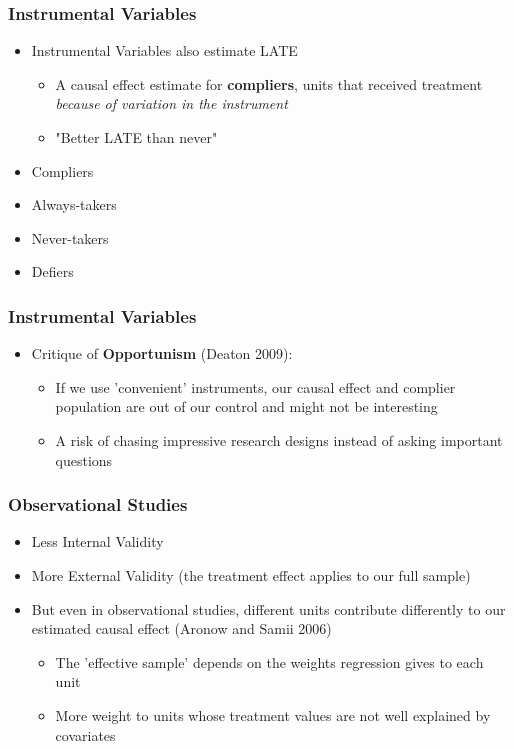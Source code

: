 \documentclass[xcolor=x11names,compress]{beamer}\usepackage[]{graphicx}\usepackage[]{xcolor}
\renewcommand{\(}{\begin{columns}}
\renewcommand{\)}{\end{columns}}
\newcommand{\<}[1]{\begin{column}{#1}}
\renewcommand{\>}{\end{column}}
\begin{document}
\begin{frame}
\frametitle{Instrumental Variables}
\begin{itemize}
\item Instrumental Variables also estimate LATE
\begin{itemize}
\item A causal effect estimate for \textbf{compliers}, units that received treatment \textit{because of variation in the instrument}
\item "Better LATE than never"
\end{itemize}
\item Compliers
\item Always-takers
\item Never-takers
\item Defiers
\end{itemize}
\end{frame}

\begin{frame}
\frametitle{Instrumental Variables}
\begin{itemize}
\item Critique of \textbf{Opportunism} (Deaton 2009):
\pause
\begin{itemize}
\item If we use 'convenient' instruments, our causal effect and complier population are out of our control and might not be interesting
\pause
\item A risk of chasing impressive research designs instead of asking important questions
\end{itemize}
\end{itemize}
\end{frame}

\begin{frame}
\frametitle{Observational Studies}
\begin{itemize}
\item Less Internal Validity
\pause
\item More External Validity (the treatment effect applies to our full sample)
\pause
\item But even in observational studies, different units contribute differently to our estimated causal effect (Aronow and Samii 2006)
\pause
\begin{itemize}
\item The 'effective sample' depends on the weights regression gives to each unit
\pause
\item More weight to units whose treatment values are not well explained by covariates
\end{itemize}
\end{itemize}
\end{frame}
\end{document}
